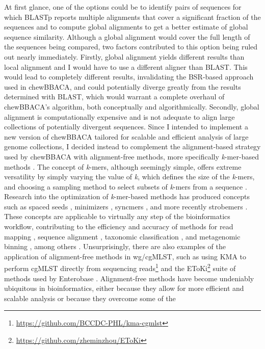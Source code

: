 At first glance, one of the options could be to identify pairs of sequences for which \ac{BLASTp} reports multiple alignments that cover a significant fraction of the sequences and to compute global alignments to get a better estimate of global sequence similarity. Although a global alignment would cover the full length of the sequences being compared, two factors contributed to this option being ruled out nearly immediately. Firstly, global alignment yields different results than local alignment and I would have to use a different aligner than \ac{BLAST}. This would lead to completely different results, invalidating the \ac{BSR}-based approach used in chewBBACA, and could potentially diverge greatly from the results determined with \ac{BLAST}, which would warrant a complete overhaul of chewBBACA's algorithm, both conceptually and algorithmically. Secondly, global alignment is computationally expensive and is not adequate to align large collections of potentially divergent sequences. Since I intended to implement a new version of chewBBACA tailored for scalable and efficient analysis of large genome collections, I decided instead to complement the alignment-based strategy used by chewBBACA with alignment-free methods, more specifically \textit{k}-mer-based methods \cite{swain_interpreting_2022, zielezinski_alignment-free_2017}. The concept of \textit{k}-mers, although seemingly simple, offers extreme versatility by simply varying the value of \textit{k}, which defines the size of the \textit{k}-mers, and choosing a sampling method to select subsets of \textit{k}-mers from a sequence \cite{shaw_theory_2022}. Research into the optimization of \textit{k}-mer-based methods has produced concepts such as spaced seeds \cite{brinda_spaced_2015, hantze_effects_2023}, minimizers \cite{schleimer_winnowing_2003, ndiaye_when_2024, belbasi_minimizer_2022, roberts_reducing_2004, marcais_improving_2017, zheng_improved_2020}, syncmers \cite{edgar_syncmers_2021, dutta_parameterized_2022}, and more recently strobemers \cite{sahlin_effective_2021, karami_designing_2024, moeckel_survey_2024}. These concepts are applicable to virtually any step of the bioinformatics workflow, contributing to the efficiency and accuracy of methods for read mapping \cite{alser_technology_2021, vasimuddin_efficient_2019, li_minimap2_2018, sahlin_survey_2023}, sequence alignment \cite{camacho_blast_2009, gaston_x-mapper_2025, clausen_rapid_2018}, taxonomic classification \cite{menzel_fast_2016, song_centrifuger_2024, kim_centrifuge_2016, portik_evaluation_2022, lu_metagenome_2022, wood_improved_2019}, and metagenomic binning \cite{han_benchmarking_2025, wu_maxbin_2016, pan_semibin2_2023}, among others \cite{moeckel_survey_2024}. Unsurprisingly, there are also examples of the application of alignment-free methods in \ac{wg/cgMLST}, such as using KMA \cite{clausen_rapid_2018} to perform \ac{cgMLST} directly from sequencing reads\footnote{\url{https://github.com/BCCDC-PHL/kma-cgmlst}} and the EToKi\footnote{\url{https://github.com/zheminzhou/EToKi}} suite of methods used by Enterobase \cite{zhou_enterobase_2020, zhou_accurate_2020}. Alignment-free methods have become undeniably ubiquitous in bioinformatics, either because they allow for more efficient and scalable analysis or because they overcome some of the 